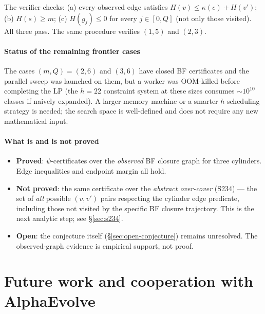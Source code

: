 \documentclass[11pt,a4paper]{article}
\theoremstyle{plain}
\theoremstyle{definition}
\begin{document}
The verifier checks: (a) every observed edge satisfies
$H(v) \le \kappa(e) + H(v')$; (b) $H(s) \ge m$; (c)
$H(g_j) \le 0$ for every $j \in [0, Q]$ (not only those visited).
All three pass. The same procedure verifies $(1, 5)$ and $(2, 3)$.

\subsection{Status of the remaining frontier cases}

The cases $(m, Q) = (2, 6)$ and $(3, 6)$ have closed BF
certificates and the parallel sweep was launched on them, but a
worker was OOM-killed before completing the LP (the $h = 22$
constraint system at these sizes consumes $\sim 10^{10}$ classes if
naively expanded). A larger-memory machine or a smarter
$h$-scheduling strategy is needed; the search space is well-defined
and does not require any new mathematical input.

\subsection{What is and is not proved}

\begin{itemize}
  \item \textbf{Proved}: $\psi$-certificates over the
        \emph{observed} BF closure graph for three cylinders.
        Edge inequalities and endpoint margin all hold.
  \item \textbf{Not proved}: the same certificate over the
        \emph{abstract over-cover} (S234) — the set of
        \emph{all} possible $(v, v')$ pairs respecting the
        cylinder edge predicate, including those not visited by
        the specific BF closure trajectory. This is the next
        analytic step; see \S\ref{sec:s234}.
  \item \textbf{Open}: the conjecture itself
        (\S\ref{sec:open-conjecture}) remains unresolved.
        The observed-graph evidence is empirical support, not
        proof.
\end{itemize}

\part{Future work and cooperation with AlphaEvolve}\label{part:future}
\end{document}
